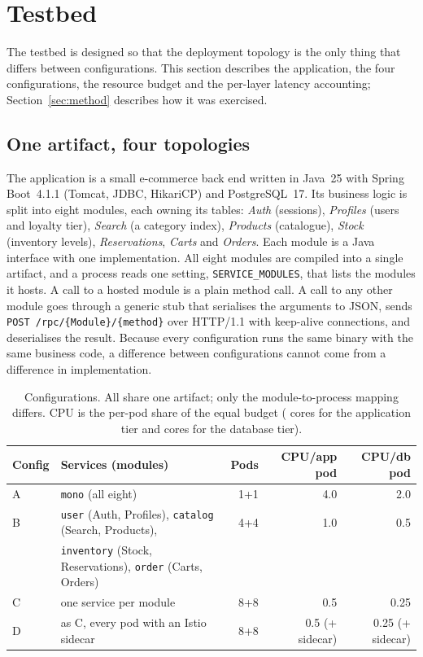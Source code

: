 \section{Testbed}
\label{sec:testbed}

The testbed is designed so that the deployment topology is the only thing that differs between
configurations. This section describes the application, the four configurations, the resource
budget and the per-layer latency accounting; Section~\ref{sec:method} describes how it was exercised.

\subsection{One artifact, four topologies}
\label{sec:artifact}

The application is a small e-commerce back end written in Java~25 with Spring Boot~4.1.1 (Tomcat, JDBC,
HikariCP) and PostgreSQL~17. Its business logic is split into eight modules, each owning its tables:
\emph{Auth} (sessions), \emph{Profiles} (users and loyalty tier), \emph{Search} (a category index),
\emph{Products} (catalogue), \emph{Stock} (inventory levels), \emph{Reservations}, \emph{Carts} and
\emph{Orders}. Each module is a Java interface with one implementation. All eight modules are compiled into a
single artifact, and a process reads one setting, \texttt{SERVICE\_MODULES}, that lists the modules it hosts.
A call to a hosted module is a plain method call. A call to any other module goes through a generic stub that
serialises the arguments to JSON, sends \texttt{POST /rpc/\{Module\}/\{method\}} over HTTP/1.1 with
keep-alive connections, and deserialises the result. Because every configuration runs the same binary with
the same business code, a difference between configurations cannot come from a difference in implementation.

\begin{table}[t]
\caption{Configurations. All share one artifact; only the module-to-process mapping differs.
CPU is the per-pod share of the equal budget ( cores for the application tier and
 cores for the database tier).}
\label{tab:configs}
\centering\footnotesize
\begin{tabular}{@{}llrrr@{}}
\toprule
Config & Services (modules) & Pods & CPU/app pod & CPU/db pod \\
\midrule
A & \texttt{mono} (all eight) & 1+1 & 4.0 & 2.0 \\
B & \texttt{user} (Auth, Profiles), \texttt{catalog} (Search, Products), & 4+4 & 1.0 & 0.5 \\
  & \texttt{inventory} (Stock, Reservations), \texttt{order} (Carts, Orders) & & & \\
C & one service per module & 8+8 & 0.5 & 0.25 \\
D & as C, every pod with an Istio sidecar & 8+8 & 0.5 (+ sidecar) & 0.25 (+ sidecar) \\
\bottomrule
\end{tabular}
\end{table}

